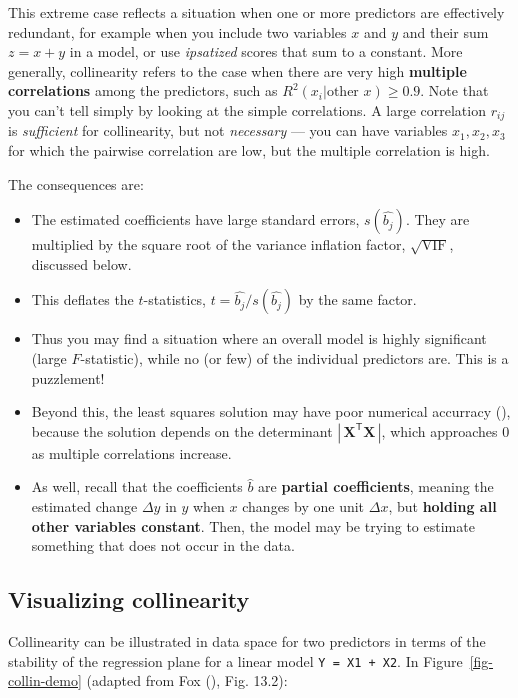 \documentclass[
  letterpaper,
  10pt,
  krantz2]{krantz}
\providecommand{\tightlist}{%
  \setlength{\itemsep}{0pt}\setlength{\parskip}{0pt}}\usepackage{longtable,booktabs,array}
\begin{document}
This extreme case reflects a situation when one or more predictors are
effectively redundant, for example when you include two variables \(x\)
and \(y\) and their sum \(z = x + y\) in a model, or use
\emph{ipsatized} scores that sum to a constant. More generally,
collinearity refers to the case when there are very high
\textbf{multiple correlations} among the predictors, such as
\(R^2 (x_i | \text{other }x) \ge 0.9\). Note that you can't tell simply
by looking at the simple correlations. A large correlation \(r_{ij}\) is
\emph{sufficient} for collinearity, but not \emph{necessary} --- you can
have variables \(x_1, x_2, x_3\) for which the pairwise correlation are
low, but the multiple correlation is high.

The consequences are:

\begin{itemize}
\tightlist
\item
  The estimated coefficients have large standard errors,
  \(s(\hat{b_j})\). They are multiplied by the square root of the
  variance inflation factor, \(\sqrt{\text{VIF}}\), discussed below.
\item
  This deflates the \(t\)-statistics, \(t = \hat{b_j} / s(\hat{b_j})\)
  by the same factor.
\item
  Thus you may find a situation where an overall model is highly
  significant (large \(F\)-statistic), while no (or few) of the
  individual predictors are. This is a puzzlement!
\item
  Beyond this, the least squares solution may have poor numerical
  accurracy (), because the
  solution depends on the determinant
  \(|\,\mathbf{X}^\mathsf{T} \mathbf{X}\,|\), which approaches 0 as
  multiple correlations increase.
\item
  As well, recall that the coefficients \(\hat{b}\) are \textbf{partial
  coefficients}, meaning the estimated change \(\Delta y\) in \(y\) when
  \(x\) changes by one unit \(\Delta x\), but \textbf{holding all other
  variables constant}. Then, the model may be trying to estimate
  something that does not occur in the data.
\end{itemize}

\subsection{Visualizing collinearity}\label{visualizing-collinearity}

Collinearity can be illustrated in data space for two predictors in
terms of the stability of the regression plane for a linear model
\texttt{Y\ =\ X1\ +\ X2}. In Figure~\ref{fig-collin-demo} (adapted from
Fox (), Fig. 13.2):
\end{document}
